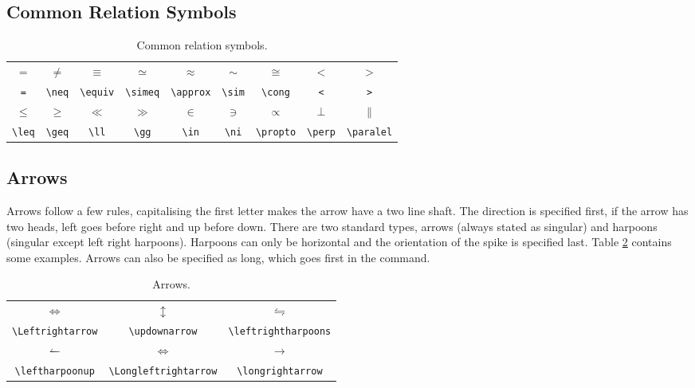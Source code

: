 \subsection{Common Relation Symbols}
%
\begin{table}[!htbp]
    \centering
    \caption{Common relation symbols.}
    \label{t:rs}
    \begin{tabular}{ccccccccc}
        $=$ & $\neq$ & $\equiv$ & $\simeq$ & $\approx$ & $\sim$ & $\cong$ & $<$ & $>$\\
        \verb|=| & \verb|\neq| & \verb|\equiv| & \verb|\simeq| & \verb|\approx| & \verb|\sim| & \verb|\cong| & \verb|<| & \verb|>| \\
        $\leq$ & $\geq$ & $\ll$ & $\gg$ & $\in$ & $\ni$ & $\propto$ & $\perp$ & $\parallel$\\
        \verb|\leq| & \verb|\geq| & \verb|\ll| & \verb|\gg| & \verb|\in| & \verb|\ni| & \verb|\propto| & \verb|\perp| & \verb|\paralel|\\
    \end{tabular}
\end{table}
%
\subsection{Arrows}
%
Arrows follow a few rules, capitalising the first letter makes the
arrow have a two line shaft.  The direction is specified first, if the
arrow has two heads, left goes before right and up before down.  There
are two standard types, arrows (always stated as singular) and
harpoons (singular except left right harpoons).  Harpoons can only be
horizontal and the orientation of the spike is specified last. Table
\ref{t:arr} contains some examples.  Arrows can also be specified as
long, which goes first in the command.
\begin{table}[!htbp]
    \centering
    \caption{Arrows.}
    \label{t:arr}
    \begin{tabular}{ccc}
        $\Leftrightarrow$ & $\updownarrow$ & $\leftrightharpoons$ \\
        \verb|\Leftrightarrow| & \verb|\updownarrow| & \verb|\leftrightharpoons| \\
        $\leftharpoonup$ & $\Longleftrightarrow$	& $\longrightarrow$\\
        \verb|\leftharpoonup| & \verb|\Longleftrightarrow| & \verb|\longrightarrow|
    \end{tabular}
\end{table}
%
